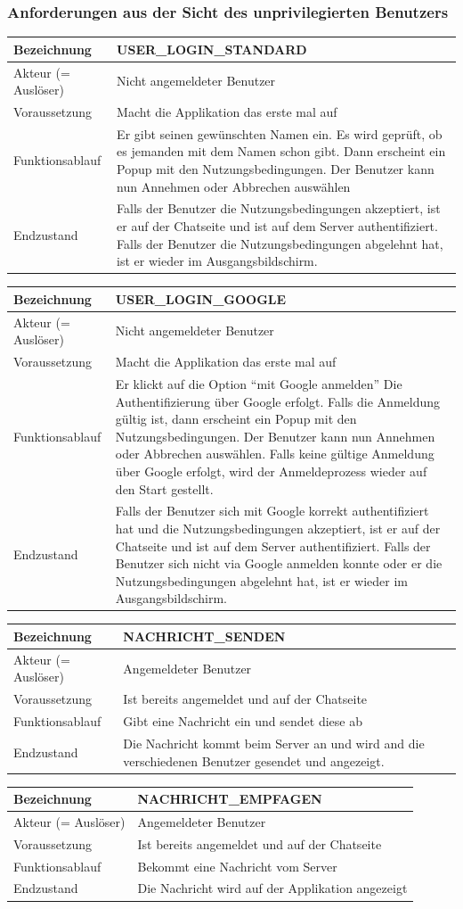 \documentclass[12pt]{article}
\newcommand{\requirementTable}[5]{
    \begin{table}[H]
      \begin{tabularx}{\textwidth}{|l|X|}
        \hline
        Bezeichnung & #1  \\ \hline
        Akteur (= Auslöser) & #2  \\ \hline
        Voraussetzung & #3  \\ \hline
        Funktionsablauf & #4  \\ \hline
        Endzustand & #5  \\ \hline
      \end{tabularx}
    \end{table}
}
\begin{document}
      \subsubsection{Anforderungen aus der Sicht des unprivilegierten Benutzers}
        \requirementTable
            {USER\_LOGIN\_STANDARD}
            {Nicht angemeldeter Benutzer}
            {Macht die Applikation das erste mal auf}
            {
            Er gibt seinen gewünschten Namen ein. \newline
            Es wird geprüft, ob es jemanden mit dem Namen schon gibt. \newline
            Dann erscheint ein Popup mit den Nutzungsbedingungen. Der Benutzer kann nun Annehmen oder Abbrechen auswählen
            }
            {
            Falls der Benutzer die Nutzungsbedingungen akzeptiert, ist er auf der Chatseite und ist auf dem Server authentifiziert. Falls der Benutzer die Nutzungsbedingungen abgelehnt hat, ist er wieder im Ausgangsbildschirm.
            }

        \requirementTable
            {USER\_LOGIN\_GOOGLE}
            {Nicht angemeldeter Benutzer}
            {Macht die Applikation das erste mal auf}
            {
            Er klickt auf die Option “mit Google anmelden” \newline
            Die Authentifizierung über Google erfolgt. \newline
            Falls die Anmeldung gültig ist, dann erscheint ein Popup mit den Nutzungsbedingungen. Der Benutzer kann nun Annehmen oder Abbrechen auswählen. \newline
            Falls keine gültige Anmeldung über Google erfolgt, wird der Anmeldeprozess wieder auf den Start gestellt.
            }
            {
            Falls der Benutzer sich mit Google korrekt authentifiziert hat und  die Nutzungsbedingungen akzeptiert, ist er auf der Chatseite und ist auf dem Server authentifiziert. \newline
            Falls der Benutzer sich nicht via Google anmelden konnte oder er die Nutzungsbedingungen abgelehnt hat, ist er wieder im Ausgangsbildschirm.
            }

        \requirementTable
            {NACHRICHT\_SENDEN}
            {Angemeldeter Benutzer}
            {Ist bereits angemeldet und auf der Chatseite}
            {Gibt eine Nachricht ein und sendet diese ab}
            {Die Nachricht kommt beim Server an und wird and die verschiedenen Benutzer gesendet und angezeigt.}

        \requirementTable
            {NACHRICHT\_EMPFAGEN}
            {Angemeldeter Benutzer}
            {Ist bereits angemeldet und auf der Chatseite}
            {Bekommt eine Nachricht vom Server}
            {Die Nachricht wird auf der Applikation angezeigt}
\end{document}
